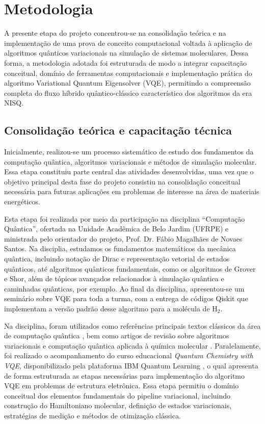 \section{Metodologia}

A presente etapa do projeto concentrou-se na consolidação teórica e na
implementação de uma prova de conceito computacional voltada à aplicação
de algoritmos quânticos variacionais na simulação de sistemas moleculares.
Dessa forma, a metodologia adotada foi estruturada de modo a integrar
capacitação conceitual, domínio de ferramentas computacionais e
implementação prática do algoritmo Variational Quantum Eigensolver (VQE),
permitindo a compreensão completa do fluxo híbrido quântico-clássico
característico dos algoritmos da era NISQ.

\subsection{Consolidação teórica e capacitação técnica}

Inicialmente, realizou-se um processo sistemático de estudo dos fundamentos
da computação quântica, algoritmos variacionais e métodos de simulação
molecular. Essa etapa constituiu parte central das atividades desenvolvidas,
uma vez que o objetivo principal desta fase do projeto consistiu na
consolidação conceitual necessária para futuras aplicações em problemas
de interesse na área de materiais energéticos.

Esta etapa foi realizada por meio 
da participação na disciplina ``Computação Quântica'', ofertada na Unidade Acadêmica de Belo 
Jardim (UFRPE) e ministrada pelo orientador do projeto, Prof. Dr. Fábio 
Magalhães de Novaes Santos. 
Na disciplia, estudamos os fundamentos matemáticos da mecânica quântica, incluindo 
notação de Dirac e representação vetorial de estados 
quânticos, até algoritmos quânticos fundamentais, como os algoritmos de 
Grover e Shor, além de tópicos avançados relacionados à simulação quântica e 
caminhadas quânticas, por exemplo. Ao final da disciplina, apresentou-se um seminário sobre VQE para toda a turma, com a entrega de códigos Qiskit que implementam a versão padrão desse algoritmo para a molécula de H$_2$.

Na disciplina, foram utilizados como referências principais textos clássicos da área de
computação quântica \cite{nielsen2000quantum,hidary2019quantum}, bem como
artigos de revisão sobre algoritmos variacionais e computação quântica
aplicada à química molecular \cite{tilly2022variational,cao2019quantum}. Paralelamente, foi realizado o acompanhamento
do curso educacional \textit{Quantum Chemistry with VQE}, disponibilizado
pela plataforma IBM Quantum Learning \cite{ibm_vqe_course}, o qual apresenta
de forma estruturada as etapas necessárias para implementação do algoritmo
VQE em problemas de estrutura eletrônica. 
Essa etapa permitiu o domínio conceitual dos elementos fundamentais do
pipeline variacional, incluindo construção do Hamiltoniano molecular,
definição de estados variacionais, estratégias de medição e métodos de
otimização clássica.


